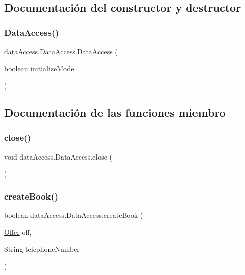 \subsection{Documentación del constructor y destructor}
\mbox{\label{classdata_access_1_1_data_access_a7999ee5a7ac4f0295bd0b7764e4f57cf}} 
\subsubsection{\texorpdfstring{DataAccess()}{DataAccess()}}
{\footnotesize\ttfamily data\+Access.\+Data\+Access.\+Data\+Access (\begin{DoxyParamCaption}\item[{boolean}]{initialize\+Mode }\end{DoxyParamCaption})}



\subsection{Documentación de las funciones miembro}
\mbox{\label{classdata_access_1_1_data_access_a58d3d443d0a2f5d74b6240248a257fd5}} 
\subsubsection{\texorpdfstring{close()}{close()}}
{\footnotesize\ttfamily void data\+Access.\+Data\+Access.\+close (\begin{DoxyParamCaption}{ }\end{DoxyParamCaption})}

\mbox{\label{classdata_access_1_1_data_access_a85fbdae5765eaacaadd42eb0e509aa9e}} 
\subsubsection{\texorpdfstring{createBook()}{createBook()}}
{\footnotesize\ttfamily boolean data\+Access.\+Data\+Access.\+create\+Book (\begin{DoxyParamCaption}\item[{\mbox{\hyperlink{classdomain_1_1_offer}{Offer}}}]{off,  }\item[{String}]{telephone\+Number }\end{DoxyParamCaption})}

